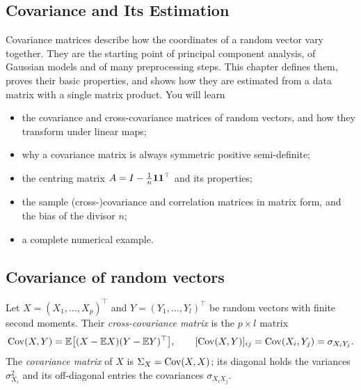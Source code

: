 \begin{notechapter}
\chapter{Covariance and Its Estimation}\label{ch:covariance-estimation}

\begin{chapterintro}
Covariance matrices describe how the coordinates of a random vector vary
together. They are the starting point of principal component analysis, of
Gaussian models and of many preprocessing steps. This chapter defines them,
proves their basic properties, and shows how they are estimated from a data
matrix with a single matrix product. You will learn
\begin{itemize}[nosep]
  \item the covariance and cross-covariance matrices of random vectors, and how
        they transform under linear maps;
  \item why a covariance matrix is always symmetric positive semi-definite;
  \item the centring matrix $A = I - \frac1n\mathbf{1}\mathbf{1}^\top$ and its properties;
  \item the sample (cross-)covariance and correlation matrices in matrix form,
        and the bias of the divisor $n$;
  \item a complete numerical example.
\end{itemize}
\end{chapterintro}

\section{Covariance of random vectors}\label{covariance-estimation:sec:definition}

\begin{definition}
Let $X = (X_1,\dots,X_p)^\top$ and $Y = (Y_1,\dots,Y_l)^\top$ be random vectors
with finite second moments. Their \emph{cross-covariance matrix} is the
$p\times l$ matrix
\[
  \operatorname{Cov}(X,Y) = \mathbb{E}\bigl[(X - \mathbb{E} X)(Y - \mathbb{E} Y)^\top\bigr],
  \qquad [\operatorname{Cov}(X,Y)]_{ij} = \operatorname{Cov}(X_i,Y_j) = \sigma_{X_iY_j}.
\]
The \emph{covariance matrix} of $X$ is $\Sigma_X = \operatorname{Cov}(X,X)$; its diagonal holds
the variances $\sigma_{X_i}^2$ and its off-diagonal entries the covariances
$\sigma_{X_iX_j}$.
\end{definition}


\end{notechapter}
